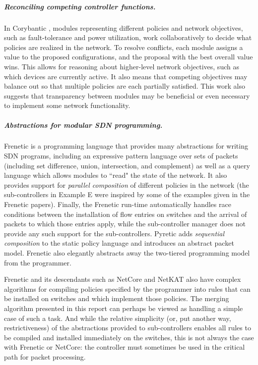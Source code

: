 \documentclass{article}
\begin{document}
\subparagraph{Reconciling competing controller functions.}

In Corybantic \cite{corybantic}, modules representing different policies and network
objectives, such as fault-tolerance and power utilization, work collaboratively
to decide what policies are realized in the network. To resolve conflicts,
each module assigns a value to the proposed configurations, and the proposal 
with the best overall value wins. This allows for reasoning about higher-level
network objectives, such as which devices are currently active. 
It also means that competing objectives may balance out so that multiple
policies are each partially satisfied.
This work also suggests that transparency between modules may be beneficial
or even necessary to implement some network functionality.

\subparagraph{Abstractions for modular SDN programming.}

Frenetic \cite{frenetic1, frenetic2} is a programming language that 
provides many abstractions for writing SDN programs, including an expressive
pattern language over sets of packets (including set difference, union,
intersection, and complement) as well as a query language which allows modules 
to ``read" the state of the network.  
It also provides support for \emph{parallel composition} of different policies
in the network (the sub-controllers in Example E were inspired by some of the
examples given in the Frenetic papers).
Finally, the Frenetic run-time automatically handles race conditions between
the installation of flow entries on switches and the arrival of packets to
which those entries apply, while the sub-controller manager does not
provide any such support for the sub-controllers.
Pyretic \cite{pyretic} adds \emph{sequential composition} to the static 
policy language and introduces an abstract packet model.
Frenetic also elegantly abstracts away the two-tiered programming
model from the programmer.

Frenetic and its descendants such as NetCore \cite{netcore} and NetKAT \cite{netkat} 
also have complex algorithms for compiling policies specified by the programmer 
into rules that can be installed on switches and which implement those policies.
The merging algorithm presented in this report can perhaps be viewed as handling
a simple case of such a task.
And while the relative simplicity (or, put another way, 
restrictiveness) of the abstractions provided to sub-controllers enables
all rules to be compiled and installed immediately on the switches,
this is not always the case with Frenetic or NetCore: the controller
must sometimes be used in the critical path for packet processing. 
\end{document}
